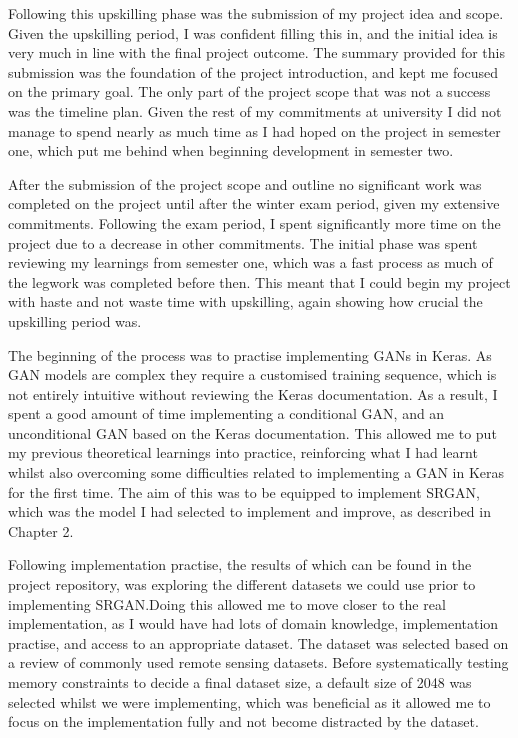 \begin{appendices}
Following this upskilling phase was the submission of my project idea and scope. Given the upskilling period, I was confident filling this in, and the initial idea is very much in line with the final project outcome. The summary provided for this submission was the foundation of the project introduction, and kept me focused on the primary goal. The only part of the project scope that was not a success was the timeline plan. Given the rest of my commitments at university I did not manage to spend nearly as much time as I had hoped on the project in semester one, which put me behind when beginning development in semester two.

After the submission of the project scope and outline no significant work was completed on the project until after the winter exam period, given my extensive commitments. Following the exam period, I spent significantly more time on the project due to a decrease in other commitments. The initial phase was spent reviewing my learnings from semester one, which was a fast process as much of the legwork was completed before then. This meant that I could begin my project with haste and not waste time with upskilling, again showing how crucial the upskilling period was.

The beginning of the process was to practise implementing GANs in Keras. As GAN models are complex they require a customised training sequence, which is not entirely intuitive without reviewing the Keras documentation. As a result, I spent a good amount of time implementing a conditional GAN, and an unconditional GAN based on the Keras documentation. This allowed me to put my previous theoretical learnings into practice, reinforcing what I had learnt whilst also overcoming some difficulties related to implementing a GAN in Keras for the first time. The aim of this was to be equipped to implement SRGAN, which was the model I had selected to implement and improve, as described in Chapter 2.

Following implementation practise, the results of which can be found in the project repository, was exploring the different datasets we could use prior to implementing SRGAN.\@ Doing this allowed me to move closer to the real implementation, as I would have had lots of domain knowledge, implementation practise, and access to an appropriate dataset. The dataset was selected based on a review of commonly used remote sensing datasets. Before systematically testing memory constraints to decide a final dataset size, a default size of 2048 was selected whilst we were implementing, which was beneficial as it allowed me to focus on the implementation fully and not become distracted by the dataset.


\end{appendices}
